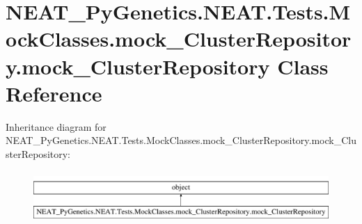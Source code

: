 \hypertarget{class_n_e_a_t___py_genetics_1_1_n_e_a_t_1_1_tests_1_1_mock_classes_1_1mock___cluster_repository_1_1mock___cluster_repository}{}\section{N\+E\+A\+T\+\_\+\+Py\+Genetics.\+N\+E\+A\+T.\+Tests.\+Mock\+Classes.\+mock\+\_\+\+Cluster\+Repository.\+mock\+\_\+\+Cluster\+Repository Class Reference}
\label{class_n_e_a_t___py_genetics_1_1_n_e_a_t_1_1_tests_1_1_mock_classes_1_1mock___cluster_repository_1_1mock___cluster_repository}
Inheritance diagram for N\+E\+A\+T\+\_\+\+Py\+Genetics.\+N\+E\+A\+T.\+Tests.\+Mock\+Classes.\+mock\+\_\+\+Cluster\+Repository.\+mock\+\_\+\+Cluster\+Repository\+:\begin{figure}[H]
\begin{center}
\leavevmode
\includegraphics[height=2.000000cm]{class_n_e_a_t___py_genetics_1_1_n_e_a_t_1_1_tests_1_1_mock_classes_1_1mock___cluster_repository_1_1mock___cluster_repository}
\end{center}
\end{figure}
